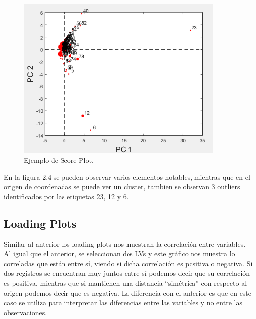 \begin{figure}[H]
\centering
\includegraphics[width=0.9\textwidth]{imagenes/figuras/2_5.png}
\caption{Ejemplo de Score Plot.}
\end{figure}
\bigskip

En la figura 2.4 se pueden observar varios elementos notables, mientras que en el origen de coordenadas se puede ver un cluster, tambien se observan 3 outliers identificados por las etiquetas 23, 12 y 6.

\subsection{Loading Plots}

Similar al anterior los loading plots nos muestran la correlación entre variables. Al igual que el anterior, se seleccionan dos LVs y este gráfico nos muestra lo correladas que están entre sí, viendo si dicha correlación es positiva o negativa. Si dos registros se encuentran muy juntos entre sí podemos decir que su correlación es positiva, mientras que si mantienen una distancia “simétrica” con respecto al origen podemos decir que es negativa. La diferencia con el anterior es que en este caso se utiliza para interpretar las diferencias entre las variables y no entre las observaciones.

